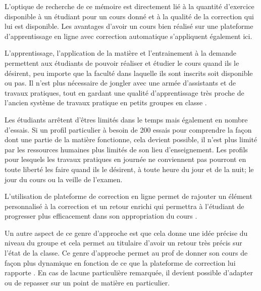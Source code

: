 \documentclass[a4paper]{report}
\begin{document}
L'optique de recherche de ce mémoire est directement lié à la quantité d'exercice disponible à un étudiant pour un cours donné et à la qualité de la correction qui lui est disponible.
Les avantages d'avoir un cours bien réalisé sur une plateforme d'apprentissage en ligne avec correction automatique s'appliquent également ici.

L'apprentissage, l'application de la matière et l'entrainement à la demande permettent aux étudiants de pouvoir réaliser et étudier le cours quand ils le désirent, peu importe que la faculté dans laquelle ils sont inscrits soit disponible ou pas.
Il n'est plus nécessaire de jongler avec une armée d'assistants et de travaux pratiques, tout en gardant une qualité d'apprentissage très proche de l'ancien système de travaux pratique en petits groupes en classe \cite{derval2015automatic}.

Les étudiants arrêtent d'êtres limités dans le temps mais également en nombre d'essais.
Si un profil particulier à besoin de 200 essais pour comprendre la façon dont une partie de la matière fonctionne, cela devient possible, il n'est plus limité par les ressources humaines plus limités de son lieu d'enseignement.
Les profils pour lesquels les travaux pratiques en journée ne conviennent pas pourront en toute liberté les faire quand ils le désirent, à toute heure du jour et de la nuit; le jour du cours ou la veille de l'examen.

L'utilisation de plateforme de correction en ligne permet de rajouter un élément personnalisé à la correction et un retour enrichi qui permettra à l'étudiant de progresser plus efficacement dans son appropriation du cours \cite{Derval2022}.

Un autre aspect de ce genre d'approche est que cela donne une idée précise du niveau du groupe et cela permet au titulaire d'avoir un retour très précis sur l'état de la classe.
Ce genre d'approche permet au prof de donner son cours de façon plus dynamique en fonction de ce que la plateforme de correction lui rapporte \cite{Martin}.
En cas de lacune particulière remarquée, il devient possible d'adapter ou de repasser sur un point de matière en particulier.
\end{document}
